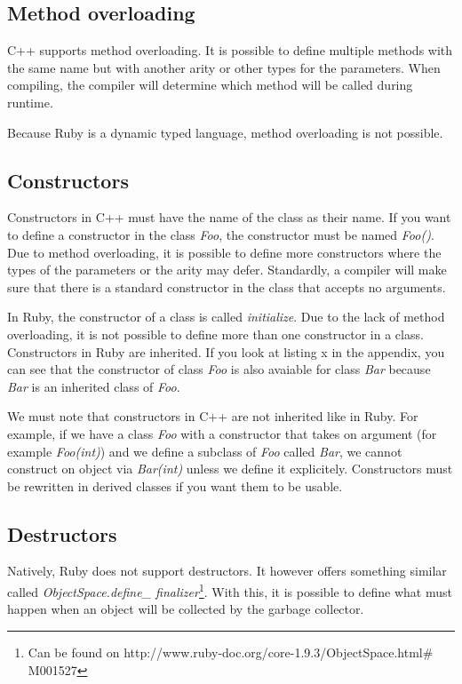 \documentclass[10pt,a4paper,twocolumn]{article}
\begin{document}
\subsection{Method overloading}

C++ supports method overloading. It is possible to define multiple methods with the same name but with another arity or other types for the parameters. When compiling, the compiler will determine which method will be called during runtime.

Because Ruby is a dynamic typed language, method overloading is not possible.

\subsection{Constructors}

Constructors in C++ must have the name of the class as their name. If you want to define a constructor in the class \textit{Foo}, the constructor must be named \textit{Foo()}. Due to method overloading, it is possible to define more constructors where the types of the parameters or the arity may defer. Standardly, a compiler will make sure that there is a standard constructor in the class that accepts no arguments. 

In Ruby, the constructor of a class is called \textit{initialize}. Due to the lack of method overloading, it is not possible to define more than one constructor in a class. Constructors in Ruby are inherited. If you look at listing x in the appendix, you can see that the constructor of class \textit{Foo} is also avaiable for class \textit{Bar} because \textit{Bar} is an inherited class of \textit{Foo}.

We must note that constructors in C++ are not inherited like in Ruby. For example, if we have a class \textit{Foo} with a constructor that takes on argument (for example \textit{Foo(int)}) and we define a subclass of \textit{Foo} called \textit{Bar}, we cannot construct on object via \textit{Bar(int)} unless we define it explicitely. Constructors must be rewritten in derived classes if you want them to be usable.

\subsection{Destructors}

Natively, Ruby does not support destructors. It however offers something similar called \textit{ObjectSpace.define\_ finalizer}\footnote{Can be found on http://www.ruby-doc.org/core-1.9.3/ObjectSpace.html\# M001527}. With this, it is possible to define what must happen when an object will be collected by the garbage collector.
\end{document}
